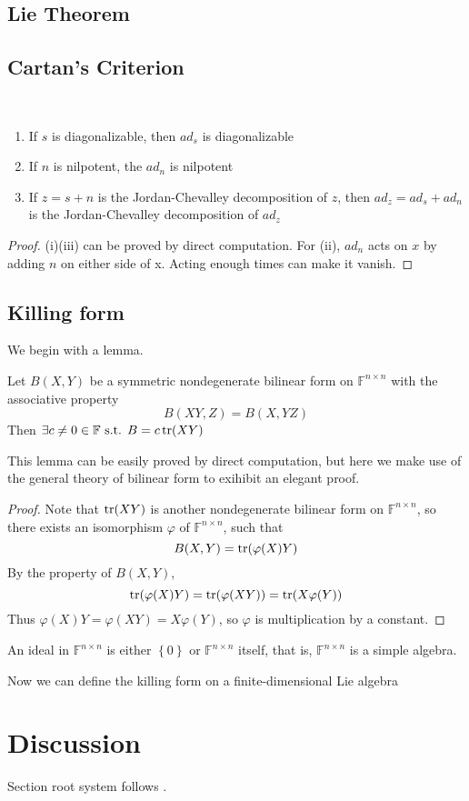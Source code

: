 \subsection{Lie Theorem}

\subsection{Cartan's Criterion}
\begin{lemma}
    \,
    \begin{enumerate}[label=(\roman*)]
        \item If $s$ is diagonalizable, then $ad_s$ is diagonalizable
        \item If $n$ is nilpotent, the $ad_n$ is nilpotent
        \item If $z=s+n$ is the Jordan-Chevalley decomposition of $z$, then $ad_z=ad_s+ad_n$ is the Jordan-Chevalley decomposition of $ad_z$
    \end{enumerate}
\end{lemma}
\begin{proof}
(i)(iii) can be proved by direct computation. For (ii), $ad_n$ acts on $x$ by adding $n$ on either side of x. Acting enough times can make it vanish.
\end{proof}
\subsection{Killing form}
We begin with a lemma.
\begin{lemma}
Let $B(X,Y)$ be a symmetric nondegenerate bilinear form on $\mathbb{F}^{n\times n}$ with the associative property \[B(XY,Z)=B(X,YZ)\]
Then $\exists c\ne 0\in \mathbb{F} \text{ s.t. }B=c\operatorname{tr}(XY)$
\end{lemma}
This lemma can be easily proved by direct computation, but here we make use of the general theory of bilinear form to exihibit an elegant proof.
\begin{proof}
Note that $\operatorname{tr}(XY)$ is another nondegenerate bilinear form on $\mathbb{F}^{n\times n}$, so there exists an isomorphism $\varphi$ of $\mathbb{F}^{n\times n}$, such that\[B(X,Y)=\operatorname{tr}(\varphi(X)Y)\]
By the property of $B(X,Y)$,\[\operatorname{tr}(\varphi(X)Y)=\operatorname{tr}
(\varphi(XY))=\operatorname{tr}(X\varphi(Y))\]
Thus $\varphi(X)Y=\varphi(XY)=X\varphi(Y)$, so $\varphi$ is multiplication by a constant.
\end{proof}
\begin{remark}
An ideal in $\mathbb{F}^{n\times n}$ is either $\left \{ 0 \right \} $ or  $\mathbb{F}^{n\times n}$ itself, that is,  $\mathbb{F}^{n\times n}$ is a simple algebra.
\end{remark}
Now we can define the killing form on a finite-dimensional Lie algebra


\section{Discussion}

Section root system follows \citet{HallBrianC2004LgLa}.